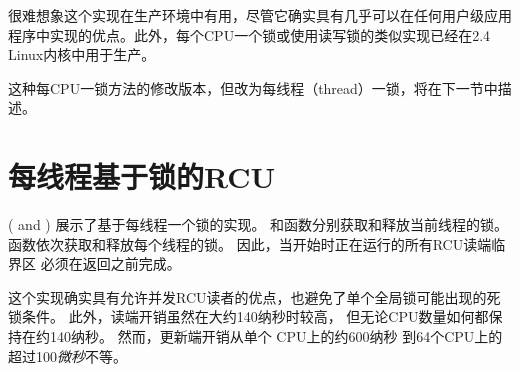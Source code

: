 很难想象这个实现在生产环境中有用，尽管它确实具有几乎可以在任何用户级应用程序中实现的优点。此外，每个CPU一个锁或使用读写锁的类似实现已经在2.4 Linux内核中用于生产。

这种每CPU一锁方法的修改版本，但改为每线程（thread）一锁，将在下一节中描述。

\section{每线程基于锁的RCU}
\label{sec:app:toyrcu:Per-Thread Lock-Based RCU}

( and )
展示了基于每线程一个锁的实现。
和函数分别获取和释放当前线程的锁。
函数依次获取和释放每个线程的锁。
因此，当开始时正在运行的所有RCU读端临界区
必须在返回之前完成。

\begin{listing}
\vspace*{-11pt}
\caption{每线程基于锁的RCU实现}
\label{lst:app:toyrcu:Per-Thread Lock-Based RCU Implementation}
\end{listing}

这个实现确实具有允许并发RCU读者的优点，也避免了单个全局锁可能出现的死锁条件。
此外，读端开销虽然在大约140纳秒时较高，
但无论CPU数量如何都保持在约140纳秒。
然而，更新端开销从单个 CPU上的约600纳秒
到64个CPU上的超过100\emph{微秒}不等。

